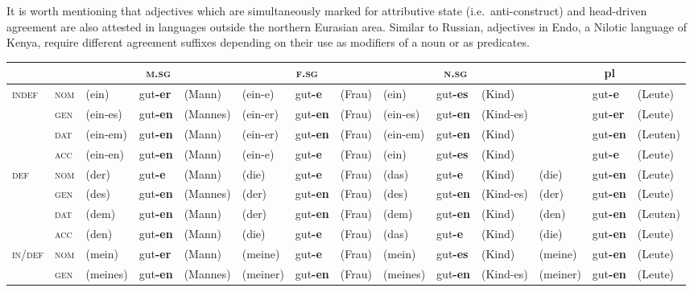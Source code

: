 It is worth mentioning that adjectives which are simultaneously marked for attributive state (i.e.~anti\hyp{}construct) and head\hyp{}driven agreement are also attested in languages outside the northern Eurasian area. Similar to Russian, adjectives in Endo, a Nilotic language of Kenya, require different agreement suffixes depending on their use as modifiers of a noun or as predicates.
\begin{sidewaystable}
\begin{scriptsize}
\begin{tabular}{ll lll lll lll lll}
\lsptoprule
&&\multicolumn{3}{c}{\textsc{m.sg}}&\multicolumn{3}{c}{\textsc{f.sg}}&\multicolumn{3}{c}{\textsc{n.sg}}&\multicolumn{3}{c}{pl}\\
\midrule
\multirow{4}{*}{\textsc{indef}}&\textsc{nom}&(ein)&gut\textbf{-er}&(Mann)&(ein-e)&gut\textbf{-e}&(Frau)&(ein)&gut\textbf{-es}&(Kind)&&gut\textbf{-e}&(Leute)\\
&\textsc{gen}&(ein-es)&gut\textbf{-en}&(Mannes)&(ein-er)&gut\textbf{-en}&(Frau)&(ein-es)&gut\textbf{-en}&(Kind-es)&&gut\textbf{-er}&(Leute)\\
&\textsc{dat}&(ein-em)&gut\textbf{-en}&(Mann)&(ein-er)&gut\textbf{-en}&(Frau)&(ein-em)&gut\textbf{-en}&(Kind)&&gut\textbf{-en}&(Leuten)\\
&\textsc{acc}&(ein-en)&gut\textbf{-en}&(Mann)&(ein-e)&gut\textbf{-e}&(Frau)&(ein)&gut\textbf{-es}&(Kind)&&gut\textbf{-e}&(Leute)\\
\midrule
\multirow{4}{*}{\textsc{def}}	&\textsc{nom}&(der)&gut\textbf{-e}&(Mann)&(die)&gut\textbf{-e}&(Frau)&(das)&gut\textbf{-e}&(Kind)&(die)&gut\textbf{-en}&(Leute)\\
&\textsc{gen}&(des)&gut\textbf{-en}&(Mannes)&(der)&gut\textbf{-en}&(Frau)&(des)&gut\textbf{-en}&(Kind-es)&(der)&gut\textbf{-en}&(Leute)\\
&\textsc{dat}&(dem)&gut\textbf{-en}&(Mann)&(der)&gut\textbf{-en}&(Frau)&(dem)&gut\textbf{-en}&(Kind)&(den)&gut\textbf{-en}&(Leuten)\\
&\textsc{acc}&(den)&gut\textbf{-en}&(Mann)&(die)&gut\textbf{-e}&(Frau)&(das)&gut\textbf{-e}&(Kind)&(die)&gut\textbf{-en}&(Leute)\\
\midrule
\multirow{4}{*}{\textsc{in/def}}	&\textsc{nom}&(mein)&gut\textbf{-er}&(Mann)&(meine)&gut\textbf{-e}&(Frau)&(mein)&gut\textbf{-es}&(Kind)&(meine)&gut\textbf{-en}&(Leute)\\
&\textsc{gen}&(meines)&gut\textbf{-en}&(Mannes)&(meiner)&gut\textbf{-en}&(Frau)&(meines)&gut\textbf{-en}&(Kind-es)&(meiner)&gut\textbf{-en}&(Leute)\\

\end{tabular}
\end{scriptsize}
\end{sidewaystable}
